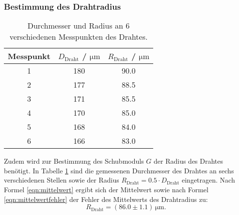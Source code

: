 \subsubsection{Bestimmung des Drahtradius}

\begin{table}
	\centering

	\caption{Durchmesser und Radius an 6 verschiedenen Messpunkten des Drahtes.}
	\label{tab:niceslabel}
	\begin{tabular}{ccc}
		\toprule
		Messpunkt & $D_{\mathrm{Draht}}$ / $\si{\micro\meter}$ & $R_{\mathrm{Draht}}$ / $\si{\micro\meter}$ \\
		\midrule
		1         & 180                                        & 90.0                                       \\
		2         & 177                                        & 88.5                                       \\
		3         & 171                                        & 85.5                                       \\
		4         & 170                                        & 85.0                                       \\
		5         & 168                                        & 84.0                                       \\
		6         & 166                                        & 83.0                                       \\
		\bottomrule
	\end{tabular}
\end{table}
Zudem wird zur Bestimmung des Schubmoduls $G$ der Radius des Drahtes benötigt.
In Tabelle \ref{tab:niceslabel} sind die gemessenen Durchmesser des Drahtes an sechs verschiedenen Stellen sowie der Radius $R_{\mathrm{Draht}}=0.5 \cdot D_{\mathrm{Draht}}$ eingetragen.
Nach Formel \eqref{eqn:mittelwert} ergibt sich der Mittelwert sowie nach Formel \eqref{eqn:mittelwertfehler} der Fehler des Mittelwerts des Drahtradius zu:
\begin{equation*}
	R_{\mathrm{Draht}}= (86.0 \pm 1.1)\,\si{\micro\meter} \text{.}
\end{equation*}
\FloatBarrier


